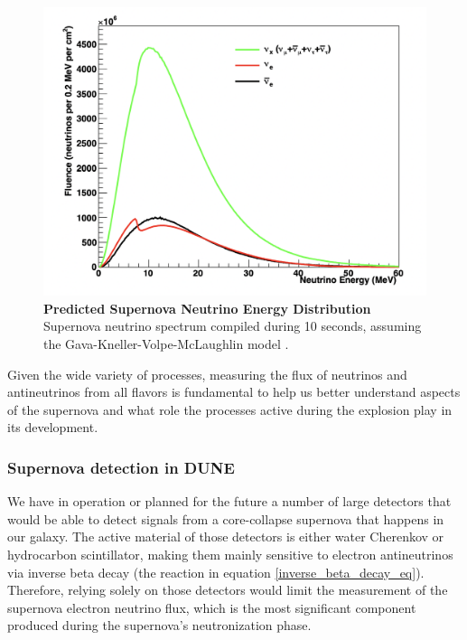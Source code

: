 \begin{figure}[h!]
    \centering
    \includegraphics[width=120mm]{Figures/supernova_nu_energy.png}
    \caption[Predicted Supernova Neutrino Energy Distribution]{{\textbf{Predicted Supernova Neutrino Energy Distribution}}\\ Supernova neutrino spectrum compiled during 10 seconds, assuming the Gava-Kneller-Volpe-McLaughlin model \cite{Supernova_Neutrino_Detection}.}
    \label{dune_supernova_nu_energy}
\end{figure}

Given the wide variety of processes, measuring the flux of neutrinos and antineutrinos from all flavors is fundamental to help us better understand aspects of the supernova and what role the processes active during the explosion play in its development\cite{Gardiner_thesis}. 

\subsubsection{Supernova detection in DUNE}

We have in operation or planned for the future a number of large detectors that would be able to detect signals from a core-collapse supernova that happens in our galaxy. The active material of those detectors is either water Cherenkov or hydrocarbon scintillator, making them mainly sensitive to electron antineutrinos via inverse beta decay (the reaction in equation \ref{inverse_beta_decay_eq}). 
Therefore, relying solely on those detectors would limit the measurement of the supernova electron neutrino flux, which is the most significant component produced during the supernova's neutronization phase. 

